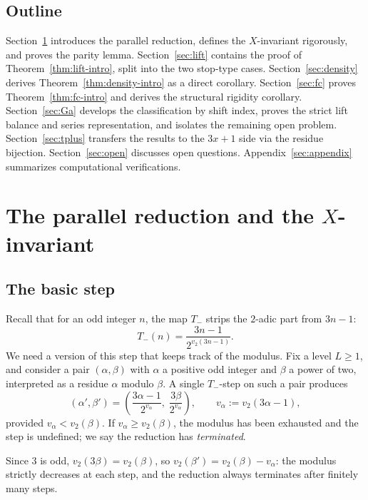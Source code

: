 \documentclass[11pt,reqno]{amsart}
\theoremstyle{plain}
\theoremstyle{definition}
\theoremstyle{remark}
\newcommand{\Tminus}{T_{-}}
\newcommand{\vtwo}{v_{2}}
\begin{document}
\subsection{Outline}

Section~\ref{sec:setup} introduces the parallel reduction, defines the
$X$-invariant rigorously, and proves the parity lemma. Section~\ref{sec:lift}
contains the proof of Theorem~\ref{thm:lift-intro}, split into the two
stop-type cases. Section~\ref{sec:density} derives
Theorem~\ref{thm:density-intro} as a direct corollary. Section~\ref{sec:fc}
proves Theorem~\ref{thm:fc-intro} and derives the structural rigidity
corollary. Section~\ref{sec:Ga} develops the classification by shift index,
proves the strict lift balance and series representation, and isolates the
remaining open problem. Section~\ref{sec:tplus} transfers the results to the
$3x+1$ side via the residue bijection. Section~\ref{sec:open} discusses open
questions. Appendix~\ref{sec:appendix} summarizes computational
verifications.

\section{The parallel reduction and the \texorpdfstring{$X$}{X}-invariant}
\label{sec:setup}

\subsection{The basic step}

Recall that for an odd integer $n$, the map $\Tminus$ strips the $2$-adic
part from $3n - 1$:
\[
\Tminus(n) = \frac{3n - 1}{2^{\vtwo(3n - 1)}}.
\]
We need a version of this step that keeps track of the modulus. Fix a level
$L \ge 1$, and consider a pair $(\alpha, \beta)$ with $\alpha$ a positive odd
integer and $\beta$ a power of two, interpreted as a residue $\alpha$ modulo
$\beta$. A single $\Tminus$-step on such a pair produces
\[
(\alpha', \beta') = \left(\frac{3\alpha - 1}{2^{v_\alpha}},\; \frac{3\beta}{2^{v_\alpha}}\right), \qquad v_\alpha := \vtwo(3\alpha - 1),
\]
provided $v_\alpha < \vtwo(\beta)$. If $v_\alpha \ge \vtwo(\beta)$, the
modulus has been exhausted and the step is undefined; we say the reduction
has \emph{terminated}.

Since $3$ is odd, $\vtwo(3\beta) = \vtwo(\beta)$, so
$\vtwo(\beta') = \vtwo(\beta) - v_\alpha$: the modulus strictly decreases at
each step, and the reduction always terminates after finitely many steps.
\end{document}
